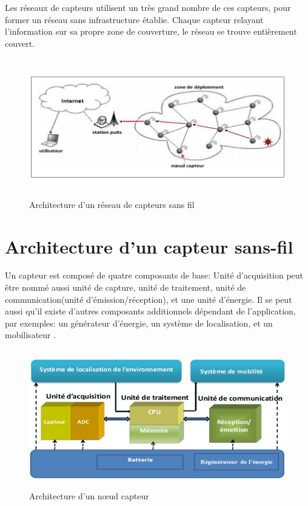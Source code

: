 Les réseaux de capteurs utilisent un très grand nombre de ces capteurs, pour former un réseau sans infrastructure établie. Chaque capteur relayant l'information sur sa propre zone de couverture, le réseau se trouve entièrement couvert.\\
\begin{figure}[H]
	\centering
	\includegraphics[width=14cm,height=6cm]{Chap1/2.png}
	\caption{Architecture d’un réseau de capteurs sans fil}
	\label{fig:ARCSF}
\end{figure}

\section{Architecture d’un capteur sans-fil}
Un capteur est composé de quatre composants de base: Unité d’acquisition peut être nommé aussi unité de capture, unité de traitement, unité de communication(unité d'émission/réception), et une unité d'énergie. 
Il se peut aussi qu'il existe d'autres composants additionnels dépendant de l'application, par exemples: un générateur d'énergie, un système de localisation, et un mobilisateur \cite{mekidicheetude}.\\
\begin{figure}[H]
	\centering
	\includegraphics[width=14cm,height=6cm]{Chap1/3.png}
	\caption{Architecture d’un nœud capteur}
	\label{fig:ANC}
\end{figure}

